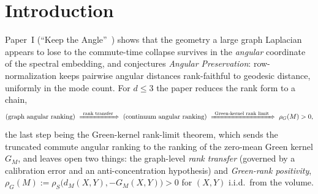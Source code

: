 \documentclass[11pt]{article}
\theoremstyle{remark}
\begin{document}
\begin{abstract}
\smallskip
\noindent\emph{Disclosure and verification.} Stated plainly: this work was developed with
substantial assistance from an AI system (a large language model), and its internal checking
was performed by fresh-context adversarial re-derivations run on the same class of system,
supplemented by a further round of \emph{AI-assisted} expert-style review (again a large
language model, prompted adversarially). That process caught and corrected numerous errors in
preparation---including a false $d=4$ ``coincidence'' (now retracted) and gaps in the
perturbative (\S\ref{sec:l2}) and subordination (\S\ref{sec:fractional}) arguments (now
repaired, the latter by grounding its analytic input in the published sharp heat-kernel
estimate \cite{nss}). \emph{No human expert has yet refereed this manuscript.} AI-assisted
verification is not a substitute for human refereeing or machine-checked proof; the
differential geometry of \S\S\ref{sec:l2}--\ref{sec:fractional} in particular is offered for
expert scrutiny, while the elementary core (the master and distributional inequalities) has in
addition been checked symbolically by computer algebra. Statements are made at the confidence
their verification supports, and the author owns every claim.
\end{abstract}

\section{Introduction}\label{sec:intro}

Paper~I (``Keep the Angle''~\cite{keeptheangle}) shows that the geometry a large graph Laplacian appears to lose
to the commute-time collapse survives in the \emph{angular} coordinate of the spectral
embedding, and conjectures \emph{Angular Preservation}: row-normalization keeps pairwise
angular distances rank-faithful to geodesic distance, uniformly in the mode count. For
$d\le3$ the paper reduces the rank form to a chain,
\[
\text{(graph angular ranking)}\ \xRightarrow{\ \text{rank transfer}\ }\
\text{(continuum angular ranking)}\ \xRightarrow{\ \text{Green-kernel rank limit}\ }\
\rho_G(M)>0,
\]
the last step being the Green-kernel rank-limit theorem, which sends the truncated commute
angular ranking to the ranking of the zero-mean Green kernel $G_M$, and leaves open two
things: the graph-level \emph{rank transfer} (governed by a calibration error and an
anti-concentration hypothesis) and \emph{Green-rank positivity},
$\rho_G(M):=\rho_S\bigl(d_M(X,Y),-G_M(X,Y)\bigr)>0$ for $(X,Y)$ i.i.d.\ from the volume.
\end{document}
